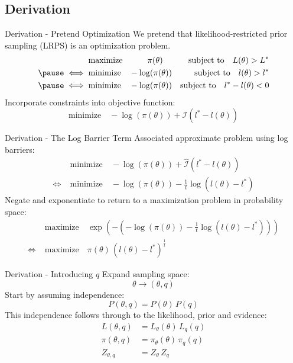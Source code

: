 \documentclass[]{beamer}
\begin{document}
  \subsection{Derivation}
  \begin{frame}{Derivation - Pretend Optimization}
    We pretend that likelihood-restricted prior sampling (LRPS) is an optimization problem.
    \begin{eqnarray*}
      \quad &\textrm{maximize} \quad\quad\quad \pi(\theta) \quad &\textrm{subject to} \quad L(\theta) > L^* \\ \pause
      \iff \; &\textrm{minimize} \quad -\log(\pi(\theta)) &\textrm{subject to} \quad l(\theta) > l^* \\ \pause
      \iff \; &\textrm{minimize} \quad -\log(\pi(\theta)) &\textrm{subject to} \quad l^* - l(\theta) < 0
    \end{eqnarray*}
    Incorporate constraints into objective function:
    $$
      \textrm{minimize} \quad -\log(\pi(\theta)) + \mathcal{I}(l^* - l(\theta))
    $$
  \end{frame}
  \begin{frame}{Derivation - The Log Barrier Term}
    Associated approximate problem using log barriers:
    \begin{align*}
      &\textrm{minimize} \quad -\log(\pi(\theta)) + \hat{\mathcal{I}}(l^* - l(\theta)) \\
      \iff \; &\textrm{minimize} \quad -\log(\pi(\theta)) - \frac{1}{t}\log(l(\theta) - l^*)
    \end{align*}
    \pause
    Negate and exponentiate to return to a maximization problem in probability space:
    \begin{align*}
      &\textrm{maximize} \quad \exp\left(-\left(-\log(\pi(\theta)) - \frac{1}{t}\log(l(\theta) - l^*)\right)\right) \\
      \iff \; &\textrm{maximize} \quad \pi(\theta) \, (l(\theta) - l^*)^{\frac{1}{t}}
    \end{align*}
  \end{frame}
  \begin{frame}{Derivation - Introducing $q$}
    Expand sampling space:
    $$
      \theta \rightarrow (\theta, q)
    $$
    \pause
    Start by assuming independence:
    $$
      P(\theta, q) = P(\theta) \, P(q)
    $$
    \pause
    This independence follows through to the likelihood, prior and evidence:
    \begin{align*}
      L(\theta, q) &= L_\theta(\theta) \, L_q(q) \\
      \pi(\theta, q) &= \pi_\theta(\theta) \, \pi_q(q) \\
      Z_{\theta, q} &= Z_{\theta} \, Z_q
    \end{align*}
  \end{frame}
\end{document}
